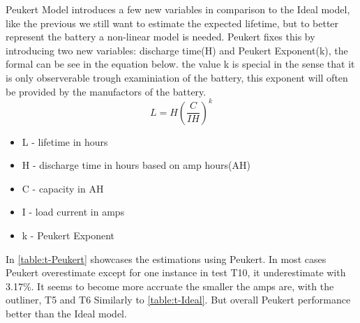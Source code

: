 Peukert Model introduces a few new variables in comparison to the Ideal model, like the previous we still want to estimate the expected lifetime, but to better represent the battery a non-linear model is needed. Peukert fixes this by introducing two new variables: discharge time(H) and Peukert Exponent(k), the formal can be see in the equation below. the value k is special in the sense that it is only observerable trough examiniation of the battery, this exponent will often be provided by the manufactors of the battery.
\begin{equation}
L=H(\frac{C}{IH})^k
\end{equation}
\begin{itemize}
	\item L - lifetime in hours
	\item H - discharge time in hours based on amp hours(AH)
	\item C - capacity in AH
	\item I - load current in amps
	\item k - Peukert Exponent
\end{itemize}

In \cref{table:t-Peukert} showcases the estimations using Peukert. In most cases Peukert overestimate except for one instance in test T10, it underestimate with 3.17\%. It seems to become more accruate the smaller the amps are, with the outliner, T5 and T6 Similarly to \cref{table:t-Ideal}. But overall Peukert performance better than the Ideal model.

